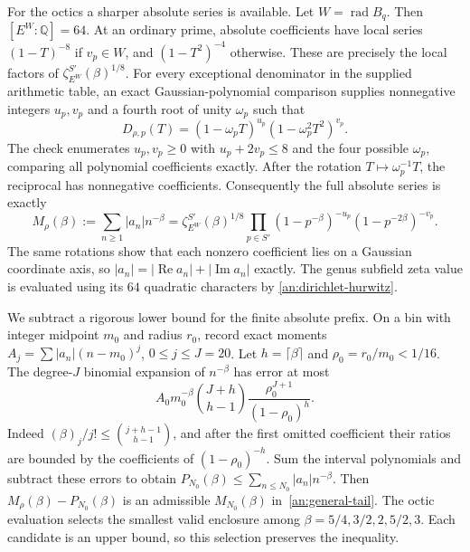 For the octics a sharper absolute series is available. Let
$W=\operatorname{rad}B_q$. Then $[E^W:\mathbb Q]=64$. At an ordinary
prime, absolute coefficients have local series $(1-T)^{-8}$ if
$v_p\in W$, and $(1-T^2)^{-4}$ otherwise. These are precisely the
local factors of $\zeta_{E^W}^{S'}(\beta)^{1/8}$.
For every exceptional denominator in the supplied arithmetic table,
an exact Gaussian-polynomial comparison supplies nonnegative integers
$u_p,v_p$ and a fourth root of unity $\omega_p$ such that
\begin{equation}\label{an:exceptional-phase}
 D_{\rho,p}(T)=(1-\omega_pT)^{u_p}
                          (1-\omega_p^2T^2)^{v_p}.
\end{equation}
The check enumerates $u_p,v_p\geq0$ with $u_p+2v_p\leq8$ and
the four possible $\omega_p$, comparing all polynomial coefficients
exactly. After the rotation $T\mapsto\omega_p^{-1}T$, the reciprocal
has nonnegative coefficients. Consequently the full absolute series is
exactly
\begin{equation}\label{an:absolute-series}
 M_\rho(\beta):=\sum_{n\geq1}|a_n|n^{-\beta}
 =\zeta_{E^W}^{S'}(\beta)^{1/8}
 \prod_{p\in S'}(1-p^{-\beta})^{-u_p}
                       (1-p^{-2\beta})^{-v_p}.
\end{equation}
The same rotations show that each nonzero coefficient lies on a
Gaussian coordinate axis, so $|a_n|=|\operatorname{Re}a_n|+
|\operatorname{Im}a_n|$ exactly. The genus subfield zeta value is
evaluated using its $64$ quadratic characters by
\eqref{an:dirichlet-hurwitz}.

We subtract a rigorous lower bound for the finite absolute prefix.
On a bin with integer midpoint $m_0$ and radius $r_0$, record exact
moments $A_j=\sum|a_n|(n-m_0)^j$, $0\leq j\leq J=20$.
Let $h=\lceil\beta\rceil$ and $\rho_0=r_0/m_0<1/16$.
The degree-$J$ binomial expansion of $n^{-\beta}$ has error at most
\begin{equation}\label{an:absolute-prefix-error}
 A_0m_0^{-\beta}\binom{J+h}{h-1}
                    \frac{\rho_0^{J+1}}{(1-\rho_0)^h}.
\end{equation}
Indeed $(\beta)_j/j!\leq\binom{j+h-1}{h-1}$, and after the first
omitted coefficient their ratios are bounded by the coefficients of
$(1-\rho_0)^{-h}$. Sum the interval polynomials and subtract these
errors to obtain $P_{N_0}(\beta)\leq\sum_{n\leq N_0}|a_n|n^{-\beta}$.
Then $M_\rho(\beta)-P_{N_0}(\beta)$ is an admissible
$M_{N_0}(\beta)$ in~\eqref{an:general-tail}.
The octic evaluation selects the smallest valid enclosure among
$\beta=5/4,3/2,2,5/2,3$. Each candidate is an upper bound, so this selection preserves the
inequality.

